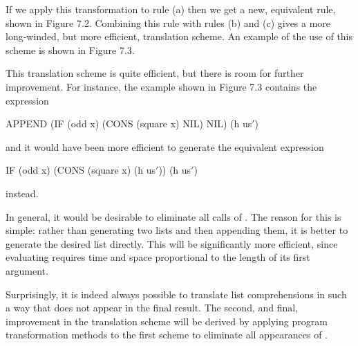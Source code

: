 If we apply this transformation to rule (a) then we get a new, equivalent
rule, shown in Figure 7.2. Combining this rule with rules (b) and (c) gives a
more long-winded, but more efficient, translation scheme. An example of the
use of this scheme is shown in Figure 7.3.



This translation scheme is quite efficient, but there is room for further improvement. For instance, the example shown in Figure 7.3 contains the expression
\begin{mlcoded}
    APPEND (IF (odd x) (CONS (square x) NIL) NIL) (h us$'$)
\end{mlcoded}
and it would have been more efficient to generate the equivalent expression
\begin{mlcoded}
    IF (odd x) (CONS (square x) (h us$'$)) (h us$'$)
\end{mlcoded}
instead.

In general, it would be desirable to eliminate all calls of . The reason for this is simple: rather than generating two lists and then appending them, it is better to generate the desired list directly. This will be significantly more efficient, since evaluating  requires time and space proportional to the length of its first argument.

Surprisingly, it is indeed always possible to translate list comprehensions in such a way that  does not appear in the final result. The second, and final, improvement in the translation scheme will be derived by applying program transformation methods to the first scheme to eliminate all appearances of .

